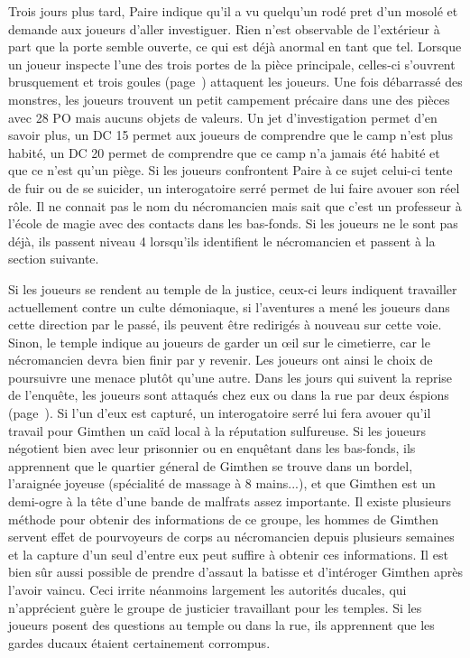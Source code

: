 Trois jours plus tard, Paire indique qu'il a vu quelqu'un rodé pret d'un mosolé et demande aux joueurs 
d'aller investiguer. Rien n'est observable de l'extérieur à part que la porte semble ouverte, ce qui est
déjà anormal en tant que tel. Lorsque un joueur inspecte l'une des trois portes de la pièce principale, 
celles-ci s'ouvrent brusquement et trois goules (page~\pageref{Goule}) attaquent les joueurs. Une fois 
débarrassé
des monstres, les joueurs trouvent un petit campement précaire dans une des pièces avec 28 PO mais aucuns
objets de valeurs. Un jet d'investigation permet d'en savoir plus, un DC 15 permet aux joueurs de comprendre
que le camp n'est plus habité, un DC 20 permet de comprendre que ce camp n'a jamais été habité et que ce 
n'est qu'un piège. Si les joueurs confrontent Paire à ce sujet celui-ci tente de fuir ou de se suicider,
un interogatoire serré permet de lui faire avouer son réel rôle. Il ne connait pas le nom du nécromancien
mais sait que c'est un professeur à l'école de magie avec des contacts dans les bas-fonds.  Si les joueurs 
ne le sont pas déjà, ils passent niveau 4 lorsqu'ils identifient le nécromancien et passent à la section
suivante.


Si les joueurs se rendent au temple de la justice, ceux-ci leurs indiquent travailler actuellement contre 
un culte démoniaque,
si l'aventures a mené les joueurs dans cette direction par le passé, ils peuvent être redirigés à nouveau 
sur cette voie. Sinon, le temple indique au joueurs de garder un \oe{}il sur le cimetierre, car le 
nécromancien devra bien finir par y revenir. Les joueurs ont ainsi le choix de poursuivre une menace 
plutôt qu'une autre. Dans les jours qui suivent la reprise de l'enquête, les joueurs sont attaqués
chez eux ou dans la rue par deux éspions (page~\pageref{Espion}). Si l'un d'eux est capturé, un interogatoire
serré lui fera avouer qu'il travail pour Gimthen un caïd local à la réputation sulfureuse. Si les joueurs
négotient bien avec leur prisonnier ou en enquêtant dans les bas-fonds, ils apprennent que le quartier 
géneral de Gimthen se trouve dans un bordel, l'araignée joyeuse (spécialité de massage à 8 mains...), 
et que Gimthen est un demi-ogre à la tête d'une bande de
malfrats assez importante. Il existe plusieurs méthode pour obtenir des informations de ce groupe, les
hommes de Gimthen servent effet de pourvoyeurs de corps au nécromancien depuis plusieurs semaines et la 
capture d'un
seul d'entre eux peut suffire à obtenir ces informations. Il est bien sûr aussi possible de prendre 
d'assaut la batisse et d'intéroger Gimthen après l'avoir vaincu. Ceci irrite néanmoins largement les 
autorités ducales, qui n'apprécient guère le groupe de justicier travaillant pour les temples. Si les
joueurs posent des questions au temple ou dans la rue, ils apprennent que les gardes ducaux étaient 
certainement corrompus.

